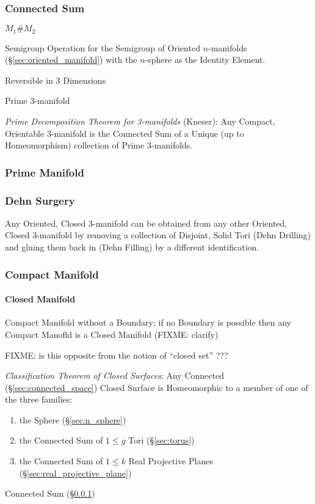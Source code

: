 \subsubsection{Connected Sum}\label{sec:connected_sum}

$M_1 \# M_2$

Semigroup Operation for the Semigroup of Oriented $n$-manifolds
(\S\ref{sec:oriented_manifold}) with the $n$-sphere as the Identity Element.

Reversible in 3 Dimensions

Prime 3-manifold

\emph{Prime Decomposition Theorem for 3-manifolds} (Kneser): Any Compact,
Orientable 3-manifold is the Connected Sum of a Unique (up to Homeomorphism)
collection of Prime 3-manifolds.



\subsubsection{Prime Manifold}\label{sec:prime_manifold}

\subsubsection{Dehn Surgery}\label{sec:dehn_surgery}

Any Oriented, Closed 3-manifold can be obtained from any other
Oriented, Closed 3-manifold by removing a collection of Disjoint,
Solid Tori (Dehn Drilling) and gluing them back in (Dehn Filling) by a
different identification.



\subsubsection{Compact Manifold}\label{sec:compact_manifold}

\paragraph{Closed Manifold}\label{sec:closed_manifold}\hfill

Compact Manifold without a Boundary; if no Boundary is possible then any
Compact Manofld is a Closed Manifold (FIXME: clarify)

FIXME: is this opposite from the notion of ``closed set'' ???

\emph{Classification Theorem of Closed Surfaces}: Any Connected
(\S\ref{sec:connected_space}) Closed Surface is Homeomorphic to a member of one
of the three families:
\begin{enumerate}
  \item the Sphere (\S\ref{sec:n_sphere})
  \item the Connected Sum of $1 \leq g$ Tori (\S\ref{sec:torus})
  \item the Connected Sum of $1 \leq k$ Real Projective Planes
    (\S\ref{sec:real_projective_plane})
\end{enumerate}
\fist Connected Sum (\S\ref{sec:connected_sum})

